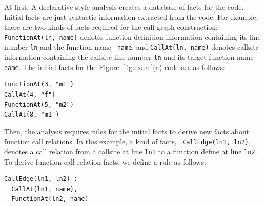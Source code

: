 At first, A declarative style analysis creates a database of facts for the
code. Initial facts are just syntactic information extracted from the code.
For example, there are two kinds of facts required for the call graph
construction; {\tt FunctionAt(ln, name)} denotes function definition
information containing its line number {\tt ln} and the function name {\tt
name}, and {\tt CallAt(ln, name)} denotes callsite information
containing the callsite line number {\tt ln} and its target function name {\tt
name}. The initial facts for the Figure~\ref{fig:exam}(a) code are as follows: 


\begin{lstlisting}
FunctionAt(3, "m1")
CallAt(4, "f")
FunctionAt(5, "m2")
CallAt(8, "m1")
\end{lstlisting}

Then, the analysis requires rules for the initial facts to derive new facts
about function call relations. In this example, a kind of facts, {\tt
CallEdge(ln1, ln2)}, denotes a call relation from a callsite at line {\tt ln1}
to a function define at line {\tt ln2}. To derive function call relation facts,
we define a rule as follows: 


\begin{lstlisting}
CallEdge(ln1, ln2) :-
  CallAt(ln1, name),
  FunctionAt(ln2, name)
\end{lstlisting}


